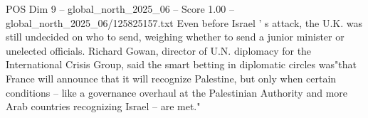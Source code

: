 \begin{textsample}{POS Dim 9 – global\_north\_2025\_06 – Score 1.00 – global\_north\_2025\_06/125825157.txt}
Even before Israel ' s attack, the U.K. was still undecided on who to send, weighing whether to send a junior minister or unelected officials.
Richard Gowan, director of U.N. diplomacy for the International Crisis Group, said the smart betting in diplomatic circles was"that France will announce that it will recognize Palestine, but only when certain conditions -- like a governance overhaul at the Palestinian Authority and more Arab countries recognizing Israel -- are met."

\end{textsample}
